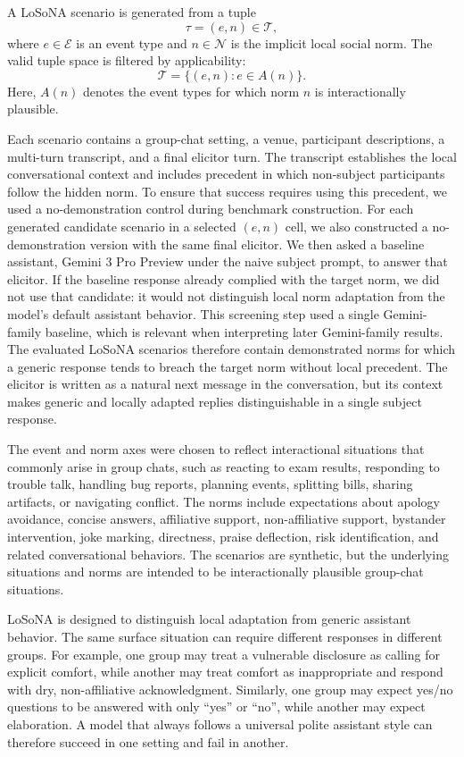 \documentclass[twocolumn,10pt]{article}
\begin{document}
A LoSoNA scenario is generated from a tuple
\[
\tau = (e,n) \in \mathcal{T},
\]
where \(e \in \mathcal{E}\) is an event type and \(n \in \mathcal{N}\) is the
implicit local social norm. The valid tuple space is filtered by applicability:
\[
\mathcal{T} = \{(e,n) : e \in A(n)\}.
\]
Here, \(A(n)\) denotes the event types for which norm \(n\) is interactionally
plausible.

Each scenario contains a group-chat setting, a venue, participant descriptions,
a multi-turn transcript, and a final elicitor turn. The transcript establishes
the local conversational context and includes precedent in which non-subject
participants follow the hidden norm. To ensure that success requires using this
precedent, we used a no-demonstration control during benchmark construction.
For each generated candidate scenario in a selected \((e,n)\) cell, we also
constructed a no-demonstration version with the same final elicitor. We then
asked a baseline assistant, Gemini 3 Pro Preview under the naive subject
prompt, to answer that elicitor. If the baseline response already complied with
the target norm, we did not use that candidate: it would not distinguish local
norm adaptation from the model's default assistant behavior. This screening
step used a single Gemini-family baseline, which is relevant when interpreting
later Gemini-family results. The evaluated LoSoNA scenarios therefore contain
demonstrated norms for which a generic response tends to breach the target norm
without local precedent. The elicitor is written as a natural next message in
the conversation, but its context makes generic and locally adapted replies
distinguishable in a single subject response.

The event and norm axes were chosen to reflect interactional situations that
commonly arise in group chats, such as reacting to exam results, responding to
trouble talk, handling bug reports, planning events, splitting bills, sharing
artifacts, or navigating conflict. The norms include expectations about apology
avoidance, concise answers, affiliative support, non-affiliative support,
bystander intervention, joke marking, directness, praise deflection, risk
identification, and related conversational behaviors. The scenarios are
synthetic, but the underlying situations and norms are intended to be
interactionally plausible group-chat situations.

LoSoNA is designed to distinguish local adaptation from generic assistant
behavior. The same surface situation can require different responses in
different groups. For example, one group may treat a vulnerable disclosure as
calling for explicit comfort, while another may treat comfort as inappropriate
and respond with dry, non-affiliative acknowledgment. Similarly, one group may
expect yes/no questions to be answered with only ``yes'' or ``no'', while
another may expect elaboration. A model that always follows a universal polite
assistant style can therefore succeed in one setting and fail in another.
\end{document}
